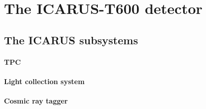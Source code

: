 \section{The ICARUS-T600 detector}



\subsection{The ICARUS subsystems}

\paragraph{TPC}

\paragraph{Light collection system}

\paragraph{Cosmic ray tagger}





